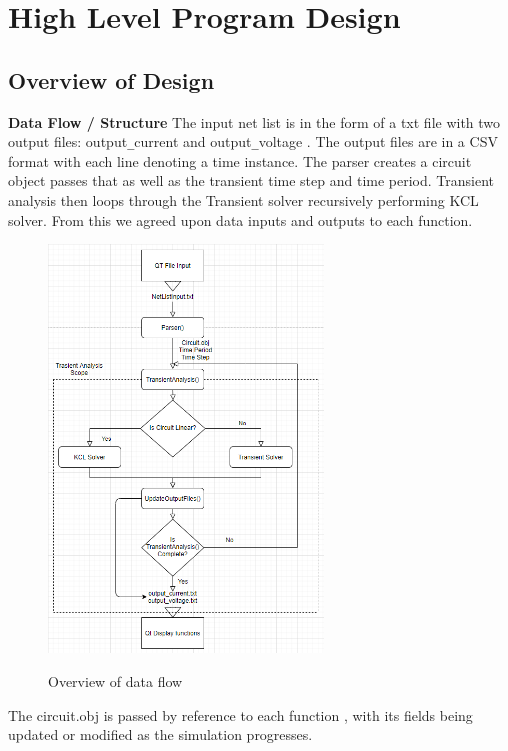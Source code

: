 \documentclass{article}
\begin{document}
\section{High Level Program Design }
\subsection{Overview of Design}
\textbf{Data Flow / Structure}
\newline
The input net list is in the form of a txt file with two output files: output\verb|_|current and output\verb|_|voltage . The output files are in a CSV format with each line denoting a time instance. The parser creates a circuit object passes that as well as the transient time step and time period. Transient analysis then loops through the Transient solver recursively performing KCL solver. From this we agreed upon data inputs and outputs to each function.

\begin{figure}[h]
    \caption{Overview of data flow}
    \centering
    \includegraphics[width=0.65\textwidth]{images/Overview.PNG}
    \label{fig:AlgoOverview}
\end{figure}

The circuit.obj is passed by reference to each function , with its fields being updated or modified as the simulation progresses. 
\end{document}
